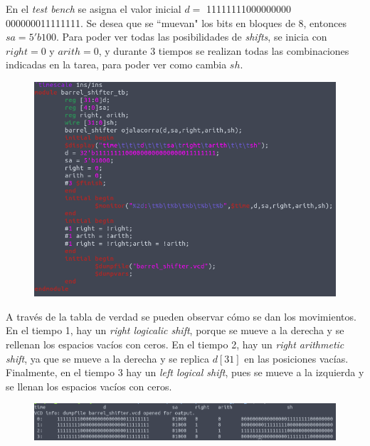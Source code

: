 \documentclass[11pt,a4paper]{article}
\begin{document}
\begin{enumerate}
En el \textit{test bench} se asigna el valor inicial $d =$ 11111111000000000 000000011111111. Se desea que se ``muevan" los bits en bloques de 8, entonces $sa = 5'b100$. Para poder ver todas las posibilidades de \textit{shifts}, se inicia con $right = 0$ y $arith = 0$, y durante 3 tiempos se realizan todas las combinaciones indicadas en la tarea, para poder ver como cambia $sh$.
\begin{figure}[h!]
\centering
\includegraphics[scale=0.4]{barrelshifter_2.png} 
\end{figure}

A través de la tabla de verdad se pueden observar cómo se dan los movimientos. En el tiempo 1, hay un \textit{right logicalic shift}, porque se mueve a la derecha y se rellenan los espacios vacíos con ceros. En el tiempo 2, hay un \textit{right arithmetic shift}, ya que se mueve a la derecha y se replica $d[31]$ en las posiciones vacías. Finalmente, en el tiempo 3 hay un \textit{left logical shift}, pues se mueve a la izquierda y se llenan los espacios vacíos con ceros.
\begin{figure}[h!]
\centering
\includegraphics[scale=0.4]{barrelshifter_3.png} 
\end{figure}
\pagebreak


\end{enumerate}
\end{document}
